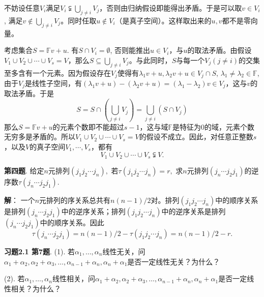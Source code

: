 不妨设任意$V_i$满足$V_i \subsetneqq \bigcup\limits_{j\neq i} V_j$，否则由归纳假设即能得出矛盾。于是可以取$v\in V_i$, 满足$v\not\in \bigcup\limits_{j\neq i} V_j$。同时任取$u\not\in V_i$（是真子空间）。这样取出来的$u,v$都不是零向量。

考虑集合$S = \mathbb{F}v + u$. 有$S\cap V_i=\emptyset$, 否则能推出$u\in V_i$，与$u$的取法矛盾。由假设$V_1\cup V_2\cup \cdots \cup V_s = V$，那么$S\subseteq \bigcup\limits_{j\neq i} V_j$。与此同时，$S$与每一个$V_j (j\neq i)$的交集至多含有一个元素。因为假设存在$V_j$使得有$\lambda_1v+u, \lambda_2v+u \in V_j\cap S$, $\lambda_1\neq\lambda_2 \in \mathbb{F}$, 由于$V_j$是线性子空间，有$(\lambda_1v+u) - (\lambda_2v+u) = (\lambda_1 - \lambda_2)v \in V_j$，这与$v$的取法矛盾。于是
$$S = S\cap (\bigcup\limits_{j\neq i} V_j) = \bigcup\limits_{j\neq i} (S \cap V_j)$$
那么$S = \mathbb{F}v + u$的元素个数即不能超过$s-1$，这与域$\mathbb{F}$是特征为0的域，元素个数无穷多是矛盾的。所以$V_1\cup V_2\cup \cdots \cup V_s = V$的假设不成立。因此，对任意正整数$s$，以及$V$的真子空间$V_1,\cdots,V_s$，都有
$$V_1\cup V_2\cup \cdots \cup V_s \subsetneqq V.$$

\fi  %

\newpageorvspace

{\bf 第四题}. 给定$n$元排列$(j_1j_2\cdots j_n),$ 若$\tau(j_1j_2\cdots j_n) = r,$ 求$n$元排列$(j_n\cdots j_2j_1)$的逆序数$\tau(j_n\cdots j_2j_1)$.

\ifIncludeAnswer

\newpageorvspace

{\bf 解}： 一个$n$元排列的序关系总共有$n(n-1)/2$对。排列$(j_1j_2\cdots j_n)$中的顺序关系是排列$(j_n\cdots j_2j_1)$中的逆序关系；排列$(j_1j_2\cdots j_n)$中的逆序关系是排列$(j_n\cdots j_2j_1)$中的顺序关系。因此
$$\tau(j_n\cdots j_2j_1) = n(n-1)/2 - \tau(j_1j_2\cdots j_n) = n(n-1)/2 - r.$$

\fi  %

\newpageorvspace

{\bf 习题2.1 第7题}. (1). 若$\alpha_1, \ldots, \alpha_n$线性无关，问$\alpha_1 + \alpha_2, \alpha_2 + \alpha_3, \ldots, \alpha_{n-1} + \alpha_n, \alpha_n + \alpha_1$是否一定线性无关？为什么？

(2). 若$\alpha_1, \ldots, \alpha_n$线性相关，问$\alpha_1 + \alpha_2, \alpha_2 + \alpha_3, \ldots, \alpha_{n-1} + \alpha_n, \alpha_n + \alpha_1$是否一定线性相关？为什么？

\ifIncludeAnswer

\newpageorvspace

